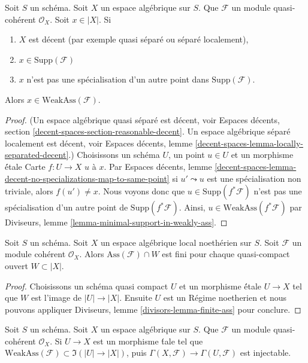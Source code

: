 \begin{lemma}
\label{lemma-minimal-support-in-weakly-ass-decent}
Soit $S$ un schéma. Soit $X$ un espace algébrique sur $S$.
Que $\mathcal{F}$ un module quasi-cohérent $\mathcal{O}_X$.
Soit $x \in |X|$. Si
\begin{enumerate}
\item $X$ est décent (par exemple quasi séparé ou séparé localement),
\item $x \in \text{Supp}(\mathcal{F})$
\item $x$ n'est pas une spécialisation d'un autre point dans
$\text{Supp}(\mathcal{F})$.
\end{enumerate}
Alors $x \in \text{WeakAss}(\mathcal{F})$.
\end{lemma}

\begin{proof}
(Un espace algébrique quasi séparé est décent, voir
Espaces décents, section \ref{decent-spaces-section-reasonable-decent}.
Un espace algébrique séparé localement est décent, voir
Espaces décents, lemme \ref{decent-spaces-lemma-locally-separated-decent}.)
Choisissons un schéma $U$, un point $u \in U$ et un morphisme \'étale
Carte $f : U \to X$ $u$ à $x$. Par
Espaces décents, lemme
\ref{decent-spaces-lemma-decent-no-specializations-map-to-same-point}
si $u' \leadsto u$ est une spécialisation non triviale, alors
$f(u') \not = x$. Nous voyons donc que $u \in \text{Supp}(f^*\mathcal{F})$
n'est pas une spécialisation d'un autre point de
$\text{Supp}(f^*\mathcal{F})$.
Ainsi, $u \in \text{WeakAss}(f^*\mathcal{F})$ par
Diviseurs, lemme \ref{lemma-minimal-support-in-weakly-ass}.
\end{proof}

\begin{lemma}
\label{lemma-finite-ass}
Soit $S$ un schéma. Soit $X$ un espace algébrique local noethérien sur $S$.
Soit $\mathcal{F}$ un module cohérent $\mathcal{O}_X$.
Alors $\text{Ass}(\mathcal{F}) \cap W$ est fini pour
chaque quasi-compact ouvert $W \subset |X|$.
\end{lemma}

\begin{proof}
Choisissons un schéma quasi compact $U$ et un morphisme \'étale $U \to X$
tel que $W$ est l'image de $|U| \to |X|$. Ensuite $U$ est un
Régime noetherien et nous pouvons appliquer
Diviseurs, lemme \ref{divisors-lemma-finite-ass} pour conclure.
\end{proof}

\begin{lemma}
\label{lemma-restriction-injective-open-contains-weakly-ass}
Soit $S$ un schéma. Soit $X$ un espace algébrique sur $S$.
Que $\mathcal{F}$ un module quasi-cohérent $\mathcal{O}_X$.
Si $U \to X$ est un morphisme \'tale tel que
$\text{WeakAss}(\mathcal{F}) \subset \Im(|U| \to |X|)$, puis
$\Gamma(X, \mathcal{F}) \to \Gamma(U, \mathcal{F})$ est injectable.
\end{lemma}

